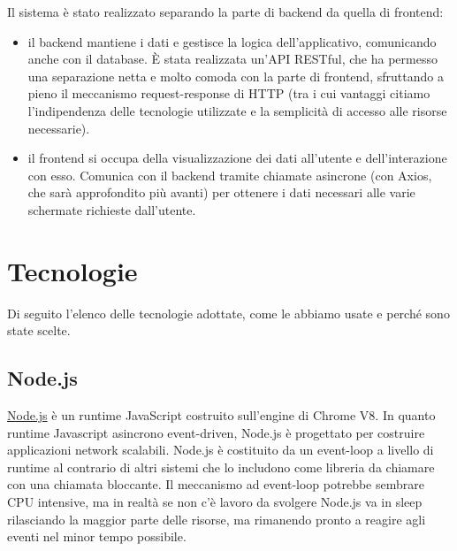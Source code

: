 \documentclass[a4paper,12pt]{report}
\newcommand{\node}{\href{https://nodejs.org/it/}{Node.js} }
\begin{document}
Il sistema è stato realizzato separando la parte di backend da quella di frontend:
\begin{itemize}
    \item il backend mantiene i dati e gestisce la logica dell'applicativo, comunicando anche con il database. È stata realizzata un'API RESTful, che ha permesso una separazione netta e molto comoda con la parte di frontend, sfruttando a pieno il meccanismo request-response di HTTP (tra i cui vantaggi citiamo l'indipendenza delle tecnologie utilizzate e la semplicità di accesso alle risorse necessarie).
    \item il frontend si occupa della visualizzazione dei dati all'utente e dell'interazione con esso. Comunica con il backend tramite chiamate asincrone (con Axios, che sarà approfondito più avanti) per ottenere i dati necessari alle varie schermate richieste dall'utente.
\end{itemize}
\clearpage
\chapter{Tecnologie}\label{sec:technologies}
Di seguito l'elenco delle tecnologie adottate, come le abbiamo usate e perché sono state scelte.
\section{Node.js}
\node è un runtime JavaScript costruito sull'engine di Chrome V8. In quanto runtime Javascript asincrono event-driven, Node.js è progettato per costruire applicazioni network scalabili. Node.js è costituito da un event-loop a livello di runtime al contrario di altri sistemi che lo includono come libreria da chiamare con una chiamata bloccante. Il meccanismo ad event-loop potrebbe sembrare CPU intensive, ma in realtà se non c'è lavoro da svolgere Node.js va in sleep rilasciando la maggior parte delle risorse, ma rimanendo pronto a reagire agli eventi nel minor tempo possibile.
\end{document}
